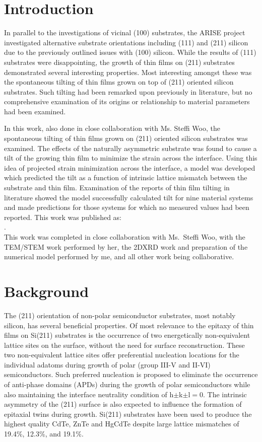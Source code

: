 \section{Introduction}\label{sec:211}
In parallel to the investigations of vicinal (100) substrates, the ARISE project investigated alternative substrate orientations including (111) and (211) silicon due to the previously outlined issues with (100) silicon.
While the results of (111) substrates were disappointing, the growth of thin films on (211) substrates demonstrated several interesting properties.
Most interesting amongst these was the spontaneous tilting of thin films grown on top of (211) oriented silicon substrates.
Such tilting had been remarked upon previously in literature, but no comprehensive examination of its origins or relationship to material parameters had been examined.

In this work, also done in close collaboration with Ms. Steffi Woo, the spontaneous tilting of thin films grown on (211) oriented silicon substrates was examined.
The effects of the naturally asymmetric substrate was found to cause a tilt of the growing thin film to minimize the strain across the interface.
Using this idea of projected strain minimization across the interface, a model was developed which predicted the tilt as a function of intrinsic lattice mismatch between the substrate and thin film.
Examination of the reports of thin film tilting in literature showed the model successfully calculated tilt for nine material systems and made predictions for those systems for which no measured values had been reported.
This work was published as:\\
 \cite{Woo2013}.\\
This work was completed in close collaboration with Ms.~Steffi Woo, with the TEM/STEM work performed by her, the 2DXRD work and preparation of the numerical model performed by me, and all other work being collaborative.
\section{Background}
The (211) orientation of non-polar semiconductor substrates, most notably silicon, has several beneficial properties.
Of most relevance to the epitaxy of thin films on Si(211) substrates is the occurrence of two energetically non-equivalent lattice sites on the surface, without the need for surface reconstruction\cite{Wright1982}.
These two non-equivalent lattice sites offer preferential nucleation locations for the individual adatoms during growth of polar (group III-V and II-VI) semiconductors.
Such preferred nucleation is proposed to eliminate the occurrence of anti-phase domains (APDs) during the growth of polar semiconductors\cite{Wright1982} while also maintaining the interface neutrality condition of h\(\pm\)k\(\pm\)l\(=\)0\cite{Wright1982}.
The intrinsic asymmetry of the (211) surface is also expected to influence the formation of epitaxial twins during growth\cite{Devenyi2011}.
Si(211) substrates have been used to produce the highest quality CdTe\cite{Zhao2011}, ZnTe\cite{Wang2011a} and HgCdTe\cite{Dhar1997a} despite large lattice mismatches of 19.4\%, 12.3\%, and 19.1\%.

